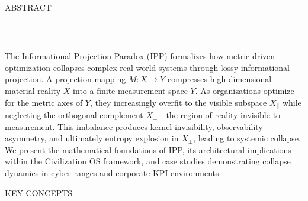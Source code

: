 \documentclass[11pt]{article}
\begin{document}
\begin{titlepage}
\end{titlepage}

\thispagestyle{empty}
\vspace*{0.6in}

{\color{ippgray}\sffamily\small ABSTRACT}\\[6pt]
{\color{ippgold}\rule{\linewidth}{1pt}}\\[22pt]

\noindent
\begin{minipage}{\linewidth}
\large
The Informational Projection Paradox (IPP) formalizes how metric-driven optimization collapses complex real-world systems through lossy informational projection.
A projection mapping $M : X \rightarrow Y$ compresses high-dimensional material reality $X$ into a finite measurement space $Y$.
As organizations optimize for the metric axes of $Y$, they increasingly overfit to the visible subspace $X_{\parallel}$ while neglecting the orthogonal complement $X_{\perp}$---the region of reality invisible to measurement.
This imbalance produces kernel invisibility, observability asymmetry, and ultimately entropy explosion in $X_{\perp}$, leading to systemic collapse.
We present the mathematical foundations of IPP, its architectural implications within the Civilization OS framework, and case studies demonstrating collapse dynamics in cyber ranges and corporate KPI environments.
\end{minipage}

\vspace{36pt}
{\color{ippgray}\sffamily\small KEY CONCEPTS}\\[12pt]
\end{document}
